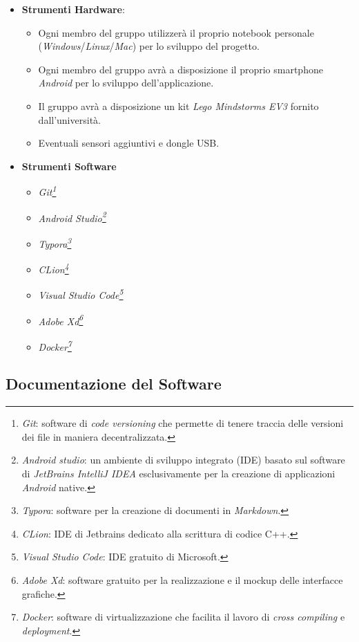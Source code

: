 \documentclass{article}
\begin{document}
\begin{itemize}
\item
\textbf{Strumenti Hardware}:

\begin{itemize}
\item
Ogni membro del gruppo utilizzerà il proprio notebook personale
(\emph{Windows}/\emph{Linux}/\emph{Mac}) per lo sviluppo del
progetto.
\item
Ogni membro del gruppo avrà a disposizione il proprio smartphone
\emph{Android} per lo sviluppo dell'applicazione.
\item
Il gruppo avrà a disposizione un kit \emph{Lego Mindstorms EV3} fornito dall'università.
\item
Eventuali sensori aggiuntivi e dongle USB.
\end{itemize}
\item
\textbf{Strumenti Software}

\begin{itemize}
\item
\emph{Git\footnote{\emph{Git}: software di \emph{code versioning}
che permette di tenere traccia delle versioni dei file in maniera
decentralizzata.}}
\item
\emph{Android Studio\footnote{\emph{Android studio}: un ambiente di
sviluppo integrato (IDE) basato sul software di \emph{JetBrains
IntelliJ IDEA} esclusivamente per la creazione di applicazioni
\emph{Android} native.}}
\item
\emph{Typora\footnote{\emph{Typora}: software per la creazione di
documenti in \emph{Markdown}.}}
\item
\emph{CLion\footnote{\emph{CLion}: IDE di Jetbrains dedicato alla
scrittura di codice C++.}}
\item
\emph{Visual Studio Code\footnote{\emph{Visual Studio Code}: IDE
gratuito di Microsoft.}}
\item
\emph{Adobe Xd\footnote{\emph{Adobe Xd}: software gratuito per la
realizzazione e il mockup delle interfacce grafiche.}}
\item
\emph{Docker\footnote{\emph{Docker}: software di virtualizzazione
che facilita il lavoro di \emph{cross compiling} e
\emph{deployment}.}}
\end{itemize}
\end{itemize}

\subsection{Documentazione del Software}
\end{document}
